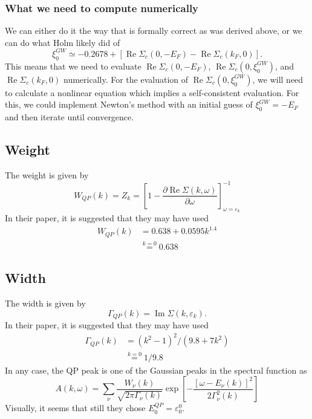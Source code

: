 \subsubsection{What we need to compute numerically}
We can either do it the way that is formally correct as was derived above, or we can do what Holm likely did of
\begin{equation}
\xi_0^{G W}\simeq-0.2678+\left[\operatorname{Re} \Sigma_c\left(0, -E_F\right)-\operatorname{Re} \Sigma_c\left(k_F, 0\right)\right].
\end{equation}
This means that we need to evaluate $\operatorname{Re} \Sigma_c\left(0, -E_F\right)$, $\operatorname{Re} \Sigma_c\left(0, \xi_0^{G W}\right)$, and
 $\operatorname{Re} \Sigma_c\left(k_F, 0\right)$ numerically. For the evaluation of $\operatorname{Re} \Sigma_c\left(0, \xi_0^{G W}\right)$, we will need to calculate a nonlinear equation which implies a self-consistent evaluation. For this, we could implement Newton's method with an initial guess of $\xi_0^{G W}=-E_F$ and then iterate until convergence.
\subsection{Weight}
The weight is given by 
\begin{equation}
    W_{Q P}(k)=Z_k=\left[1-\frac{\partial \operatorname{Re} \Sigma(k, \omega)}{\partial \omega}\right]_{\omega=\varepsilon_k}^{-1}
\end{equation}
In their paper, it is suggested that they may have used
\begin{align}
    W_{Q P}(k)&=0.638+0.0595k ^{1.4} \\
&\overset{k=0}{=}0.638
\end{align}
\subsection{Width}
The width is given by
\begin{equation}
    \Gamma_{Q P}(k)=\operatorname{Im} \Sigma\left(k, \varepsilon_k\right).
\end{equation}
In their paper, it is suggested that they may have used
\begin{align}
    \Gamma_{Q P}(k)&=\left(k^2-1\right)^2 /\left(9.8+7 k^2\right)\\
&\overset{k=0}{=}1/9.8
    \end{align}
In any case, the QP peak is one of the Gaussian peaks in the spectral function as
\begin{equation}
    A(k, \omega)=\sum_\nu \frac{W_\nu(k)}{\sqrt{2 \pi \Gamma_\nu(k)}} \exp \left[-\frac{\left[\omega-E_\nu(k)\right]^2}{2 \Gamma_\nu^2(k)}\right]
\end{equation}
Visually, it seems that still they chose $E^{QP}_0 = \varepsilon^0_0$. 
